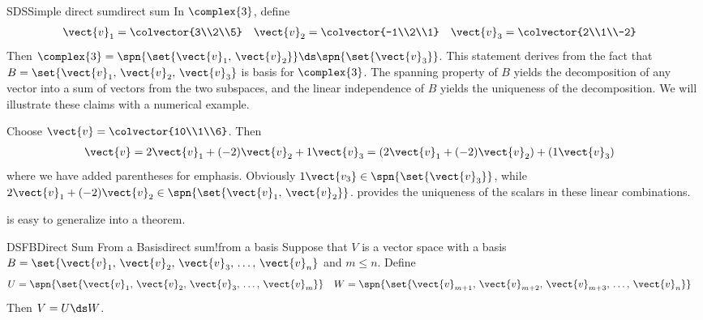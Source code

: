 \begin{example}{SDS}{Simple direct sum}{direct sum}
In $\complex{3}$, define
%
\begin{align*}
\vect{v}_1&=\colvector{3\\2\\5}
&
\vect{v}_2&=\colvector{-1\\2\\1}
&
\vect{v}_3&=\colvector{2\\1\\-2}
\end{align*}
%
Then $\complex{3}=\spn{\set{\vect{v}_1,\,\vect{v}_2}}\ds\spn{\set{\vect{v}_3}}$.  This statement derives from the fact that $B=\set{\vect{v}_1,\,\vect{v}_2,\,\vect{v}_3}$ is basis for $\complex{3}$.  The spanning property of $B$ yields the decomposition of any vector into a sum of vectors from the two subspaces, and the linear independence of $B$ yields the uniqueness of the decomposition.  We will illustrate these claims with a numerical example.\par
Choose $\vect{v}=\colvector{10\\1\\6}$.  Then
%
\begin{align*}
\vect{v}
&=2\vect{v}_1+(-2)\vect{v}_2+1\vect{v}_3
=\left(2\vect{v}_1+(-2)\vect{v}_2\right)+\left(1\vect{v}_3\right)
\end{align*}
%
where we have added parentheses for emphasis.  Obviously $1\vect{v_3}\in\spn{\set{\vect{v}_3}}$, while $2\vect{v}_1+(-2)\vect{v}_2\in\spn{\set{\vect{v}_1,\,\vect{v}_2}}$.   provides the uniqueness of the scalars in these linear combinations.
%
\end{example}
%
 is easy to generalize into a theorem.
%
\begin{theorem}{DSFB}{Direct Sum From a Basis}{direct sum!from a basis}
Suppose that $V$ is a vector space with a basis 
$B=\set{\vect{v}_1,\,\vect{v}_2,\,\vect{v}_3,\,\dots,\,\vect{v}_n}$ and $m\leq n$.  Define
%
\begin{align*}
U&=\spn{\set{\vect{v}_1,\,\vect{v}_2,\,\vect{v}_3,\,\dots,\,\vect{v}_m}}
&
W&=\spn{\set{\vect{v}_{m+1},\,\vect{v}_{m+2},\,\vect{v}_{m+3},\,\dots,\,\vect{v}_n}}
\end{align*}
%
Then $V=U\ds W$.
\end{theorem}
%
